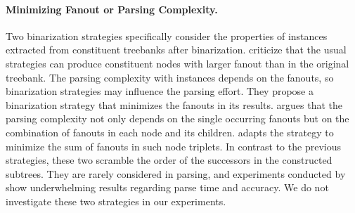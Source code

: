 \documentclass[../../document.tex]{subfiles}
\begin{document}
    \paragraph{Minimizing Fanout or Parsing Complexity.}
    Two binarization strategies specifically consider the properties of  instances extracted from constituent treebanks after binarization.
     criticize that the usual strategies can produce constituent nodes with larger fanout than in the original treebank.
    The parsing complexity with  instances depends on the fanouts, so binarization strategies may influence the parsing effort.
    They propose a binarization strategy that minimizes the fanouts in its results.
     argues that the parsing complexity not only depends on the single occurring fanouts but on the combination of fanouts in each node and its children.
     adapts the strategy to minimize the sum of fanouts in such node triplets.
    In contrast to the previous strategies, these two scramble the order of the successors in the constructed subtrees.
    They are rarely considered in parsing, and experiments conducted by \citet{Cra12} show underwhelming results regarding parse time and accuracy.
    We do not investigate these two strategies in our experiments.
\end{document}

